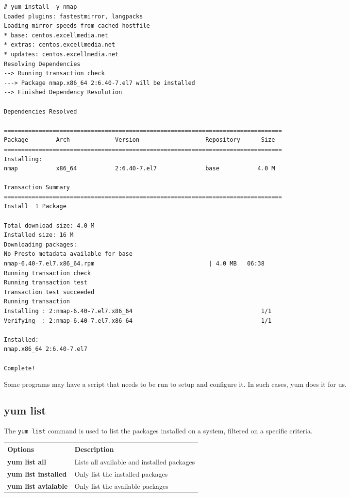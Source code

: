 \vspace{-15pt}
\begin{verbatim}
# yum install -y nmap
Loaded plugins: fastestmirror, langpacks
Loading mirror speeds from cached hostfile
* base: centos.excellmedia.net
* extras: centos.excellmedia.net
* updates: centos.excellmedia.net
Resolving Dependencies
--> Running transaction check
---> Package nmap.x86_64 2:6.40-7.el7 will be installed
--> Finished Dependency Resolution

Dependencies Resolved

================================================================================
Package        Arch             Version                   Repository      Size
================================================================================
Installing:
nmap           x86_64           2:6.40-7.el7              base           4.0 M

Transaction Summary
================================================================================
Install  1 Package

Total download size: 4.0 M
Installed size: 16 M
Downloading packages:
No Presto metadata available for base
nmap-6.40-7.el7.x86_64.rpm                                 | 4.0 MB   06:38     
Running transaction check
Running transaction test
Transaction test succeeded
Running transaction
Installing : 2:nmap-6.40-7.el7.x86_64                                     1/1 
Verifying  : 2:nmap-6.40-7.el7.x86_64                                     1/1 

Installed:
nmap.x86_64 2:6.40-7.el7                                                      

Complete!
\end{verbatim}
\vspace{-10pt}

Some programs may have a script that needs to be run to setup and configure it. In such cases, yum does it for us. 

\subsection{yum list}
The \verb|yum list| command is used to list the packages installed on a system, filtered on a specific criteria. 

\noindent
\begin{tabular}{lM{0.72}}
	\toprule
	\textbf{Options} &\textbf{Description} \\
	\midrule
	\textbf{yum list all}	&Lists all available and installed packages \\
	\textbf{yum list installed}	&Only list the installed packages \\
	\textbf{yum list avialable}	&Only list the available packages \\
	\bottomrule
\end{tabular}

